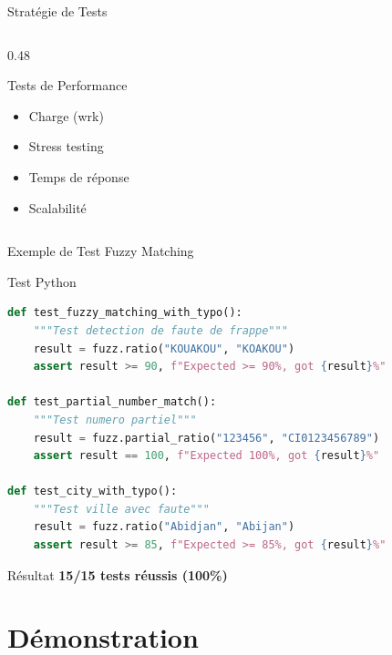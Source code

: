 \documentclass[aspectratio=169]{beamer}
\begin{document}
\begin{frame}{Stratégie de Tests}
\begin{columns}[T]
\begin{column}{0.48\textwidth}
            \begin{block}{Tests de Performance}
                \begin{itemize}
                    \item Charge (wrk)
                    \item Stress testing
                    \item Temps de réponse
                    \item Scalabilité
                \end{itemize}
            \end{block}
        \end{column}
    \end{columns}
\end{frame}

\begin{frame}[fragile]{Exemple de Test Fuzzy Matching}
    \begin{block}{Test Python}
        \small
\begin{lstlisting}[language=Python]
def test_fuzzy_matching_with_typo():
    """Test detection de faute de frappe"""
    result = fuzz.ratio("KOUAKOU", "KOAKOU")
    assert result >= 90, f"Expected >= 90%, got {result}%"

def test_partial_number_match():
    """Test numero partiel"""
    result = fuzz.partial_ratio("123456", "CI0123456789")
    assert result == 100, f"Expected 100%, got {result}%"

def test_city_with_typo():
    """Test ville avec faute"""
    result = fuzz.ratio("Abidjan", "Abijan")
    assert result >= 85, f"Expected >= 85%, got {result}%"
\end{lstlisting}
    \end{block}

    \begin{exampleblock}{Résultat}
        \textcolor{vertSucces}{\faCheckCircle} \textbf{15/15 tests réussis (100\%)}
    \end{exampleblock}
\end{frame}

\section{Démonstration}
\end{document}
